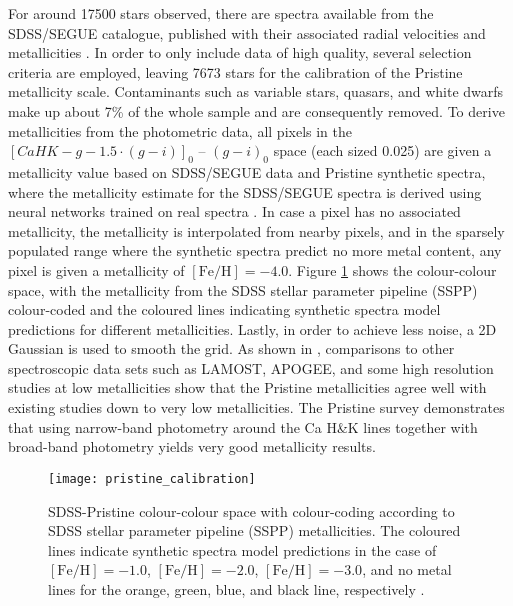 \documentclass[a4paper,11pt]{article}
\begin{document}
%
For around 17500 stars observed, there are spectra available from the SDSS/SEGUE catalogue, published with their associated radial velocities and metallicities \citep{segue,sdss3}. In order to only include data of high quality, several selection criteria are employed, leaving 7673 stars for the calibration of the Pristine metallicity scale. Contaminants such as variable stars, quasars, and white dwarfs make up about 7\% of the whole sample and are consequently removed. To derive metallicities from the photometric data, all pixels in the $[CaHK-g-1.5\cdot(g-i)]_0$ -- $(g-i)_0$ space (each sized 0.025) are given a metallicity value based on SDSS/SEGUE data and Pristine synthetic spectra, where the metallicity estimate for the SDSS/SEGUE spectra is derived using neural networks trained on real spectra \citep[see][]{lee08}. In case a pixel has no associated metallicity, the metallicity is interpolated from nearby pixels, and in the sparsely populated range where the synthetic spectra predict no more metal content, any pixel is given a metallicity of $\mathrm{[Fe/H]}=-4.0$. Figure \ref{fig:pristine_cal} shows the colour-colour space, with the metallicity from the SDSS stellar parameter pipeline (SSPP) colour-coded and the coloured lines indicating synthetic spectra model predictions for different metallicities. Lastly, in order to achieve less noise, a 2D Gaussian is used to smooth the grid. As shown in \citet{pristine}, comparisons to other spectroscopic data sets such as LAMOST, APOGEE, and some high resolution studies at low metallicities show that the Pristine metallicities agree well with existing studies down to very low metallicities. The Pristine survey demonstrates that using narrow-band photometry around the Ca H\&K lines together with broad-band photometry yields very good metallicity results.
%
\begin{figure}
 \centering
 \texttt{[image: pristine\_calibration]}
 \caption[SDSS-Pristine colour-colour space]{SDSS-Pristine colour-colour space with colour-coding according to SDSS stellar parameter pipeline (SSPP) metallicities. The coloured lines indicate synthetic spectra model predictions in the case of $\mathrm{[Fe/H]}=-1.0$, $\mathrm{[Fe/H]}=-2.0$, $\mathrm{[Fe/H]}=-3.0$, and no metal lines for the orange, green, blue, and black line, respectively \citep{pristine}.}
 \label{fig:pristine_cal}
\end{figure}\\ \\
%
\end{document}
